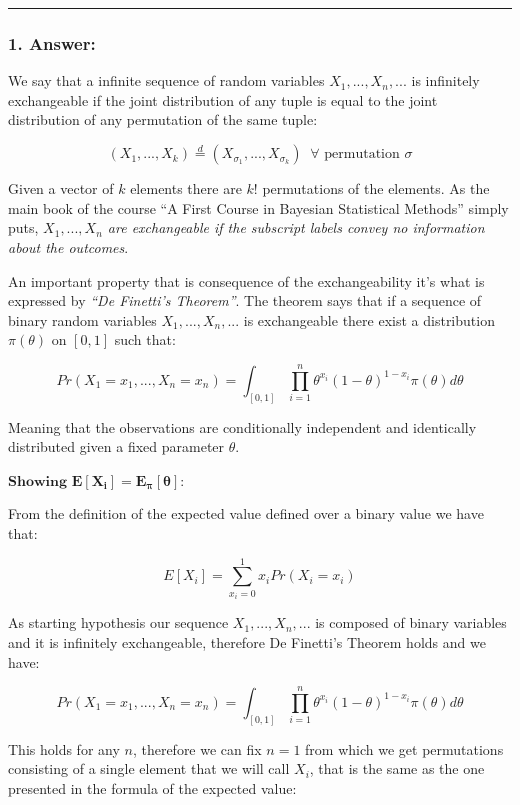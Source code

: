 \documentclass[
]{article}
\begin{document}
\begin{center}\rule{0.5\linewidth}{0.5pt}\end{center}

\hypertarget{answer-10}{%
\subsubsection{1. Answer:}\label{answer-10}}

We say that a infinite sequence of random variables \(X_1,...,X_n,...\)
is infinitely exchangeable if the joint distribution of any tuple is
equal to the joint distribution of any permutation of the same tuple:

\[
(X_1,...,X_k) \stackrel{d}{=} (X_{\sigma_1},...,X_{\sigma_k}) \;\; \forall \text{ permutation } \sigma
\]

Given a vector of \(k\) elements there are \(k!\) permutations of the
elements. As the main book of the course ``A First Course in Bayesian
Statistical Methods'' simply puts, \emph{\(X_1,...,X_n\) are
exchangeable if the subscript labels convey no information about the
outcomes}.

An important property that is consequence of the exchangeability it's
what is expressed by \emph{``De Finetti's Theorem''}. The theorem says
that if a sequence of binary random variables \(X_1,...,X_n,...\) is
exchangeable there exist a distribution \(\pi(\theta)\) on \([0,1]\)
such that:

\[
Pr(X_1=x_1,...,X_n=x_n) = 
\int_{[0,1]} \prod_{i=1}^n\theta^{x_i}(1 - \theta)^{1 - x_i} \pi(\theta)d\theta
\]

Meaning that the observations are conditionally independent and
identically distributed given a fixed parameter \(\theta\).

\(\textbf{Showing } \mathbf{E[X_i]=E_{\pi}[\theta]}\):

From the definition of the expected value defined over a binary value we
have that:

\[
E[X_i] = \sum_{x_i=0}^1x_iPr(X_i=x_i)
\]

As starting hypothesis our sequence \(X_1,...,X_n,...\) is composed of
binary variables and it is infinitely exchangeable, therefore De
Finetti's Theorem holds and we have:

\[
Pr(X_1=x_1,...,X_n=x_n) = 
\int_{[0,1]} \prod_{i=1}^n\theta^{x_i}(1 - \theta)^{1 - x_i} \pi(\theta)d\theta
\]

This holds for any \(n\), therefore we can fix \(n = 1\) from which we
get permutations consisting of a single element that we will call
\(X_i\), that is the same as the one presented in the formula of the
expected value:
\end{document}
